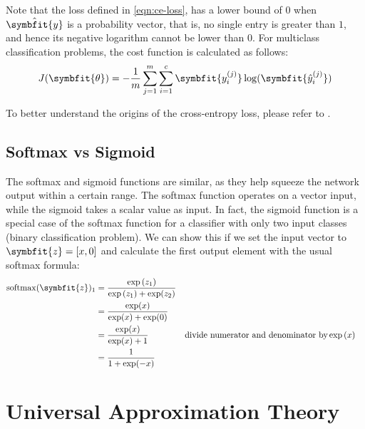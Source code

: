 Note that the loss defined in \cref{eqn:ce-loss}, has a lower bound of $0$ when $\hat{\symbfit{y}}$ is a probability vector, that is, no single entry is greater than $1$, and hence its negative logarithm cannot be lower than $0$. For multiclass classification problems, the cost function is calculated as follows:
\begin{equation}
    J(\symbfit{\theta}) = - \frac{1}{m} \sum_{j=1}^{m} \sum_{i=1}^{c} \symbfit{y_{i}^{(j)}}\log(\symbfit{\hat{y}_{i}^{(j)}})
\end{equation}

To better understand the origins of the cross-entropy loss, please refer to \textcite{zhang2021dive}.

\subsection{Softmax vs Sigmoid}\label{ssec:softmax-vs-sigmoid}
The softmax and sigmoid functions are similar, as they help squeeze the network output within a certain range. The softmax function operates on a vector input, while the sigmoid takes a scalar value as input. In fact, the sigmoid function is a special case of the softmax function for a classifier with only two input classes (binary classification problem). We can show this if we set the input vector to $\symbfit{z} = [x, 0]$ and calculate the first output element with the usual softmax formula:
\begin{align*}
    \operatorname{softmax}(\symbfit{z})_{1}&=\frac{\exp{(z_{1})}}{\exp{(z_{1})}+\exp(z_{2})} \\
    &= \frac{\exp(x)}{\exp(x)+\exp(0)} \\
    &= \frac{\exp(x)}{\exp(x)+1} && \text{divide numerator and denominator by} \exp{(x)}\\
    &= \frac{1}{1 + \exp(-x)}
\end{align*}


\section{Universal Approximation Theory}\label{sec:uat}

